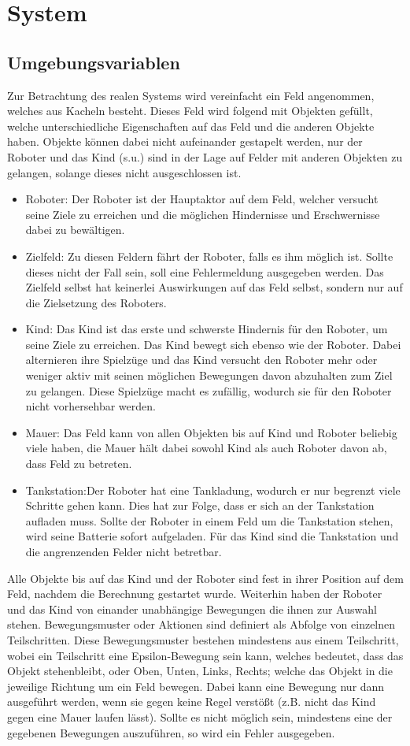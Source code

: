\section{System}
\subsection{Umgebungsvariablen}
Zur Betrachtung des realen Systems wird vereinfacht ein Feld angenommen, welches aus Kacheln besteht. Dieses Feld wird folgend mit Objekten gefüllt, welche unterschiedliche Eigenschaften auf das Feld und die anderen Objekte haben. Objekte können dabei nicht aufeinander gestapelt werden, nur der Roboter und das Kind (s.u.) sind in der Lage auf Felder mit anderen Objekten zu gelangen, solange dieses nicht ausgeschlossen ist.
\begin{itemize}
	\item Roboter: Der Roboter ist der Hauptaktor auf dem Feld, welcher versucht seine Ziele zu erreichen und die möglichen Hindernisse und Erschwernisse dabei zu bewältigen.
	\item Zielfeld: Zu diesen Feldern fährt der Roboter, falls es ihm möglich ist. Sollte dieses nicht der Fall sein, soll eine Fehlermeldung ausgegeben werden. Das Zielfeld selbst hat keinerlei Auswirkungen auf das Feld selbst, sondern nur auf die Zielsetzung des Roboters.
	\item Kind: Das Kind ist das erste und schwerste Hindernis für den Roboter, um seine Ziele zu erreichen. Das Kind bewegt sich ebenso wie der Roboter. Dabei alternieren ihre Spielzüge und das Kind versucht den Roboter mehr oder weniger aktiv mit seinen möglichen Bewegungen davon abzuhalten zum Ziel zu gelangen. Diese Spielzüge macht es zufällig, wodurch sie für den Roboter nicht vorhersehbar werden.
	\item Mauer: Das Feld kann von allen Objekten bis auf Kind und Roboter beliebig viele haben, die Mauer hält dabei sowohl Kind als auch Roboter davon ab, dass Feld zu betreten.
	\item Tankstation:Der Roboter hat eine Tankladung, wodurch er nur begrenzt viele Schritte gehen kann. Dies hat zur Folge, dass er sich an der Tankstation aufladen muss. Sollte der Roboter in einem Feld um die Tankstation stehen, wird seine Batterie sofort aufgeladen. Für das Kind sind die Tankstation und die angrenzenden Felder nicht betretbar.
\end{itemize}
Alle Objekte bis auf das Kind und der Roboter sind fest in ihrer Position auf dem Feld, nachdem die Berechnung gestartet wurde. Weiterhin haben der Roboter und das Kind von einander unabhängige Bewegungen die ihnen zur Auswahl stehen. Bewegungsmuster oder Aktionen sind definiert als Abfolge von einzelnen Teilschritten. Diese Bewegungsmuster bestehen mindestens aus einem Teilschritt, wobei ein Teilschritt eine Epsilon-Bewegung sein kann, welches bedeutet, dass das Objekt stehenbleibt, oder Oben, Unten, Links, Rechts; welche das Objekt in die jeweilige Richtung um ein Feld bewegen. Dabei kann eine Bewegung nur dann ausgeführt werden, wenn sie gegen keine Regel verstößt (z.B. nicht das Kind gegen eine Mauer laufen lässt). Sollte es nicht möglich sein, mindestens eine der gegebenen Bewegungen auszuführen, so wird ein Fehler ausgegeben. \\
